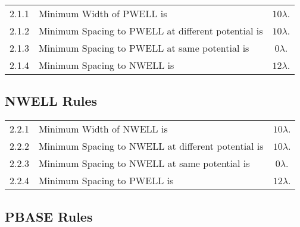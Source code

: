\begin{flushleft}
    \begin{tabular}{c l c}
        2.1.1  & Minimum Width of PWELL is & $ 10 \lambda $. \\
        2.1.2  & Minimum Spacing to PWELL at different potential is & $ 10 \lambda $. \\
        2.1.3  & Minimum Spacing to PWELL at same potential is & $ 0 \lambda $. \\
        2.1.4  & Minimum Spacing to NWELL is & $ 12 \lambda $. \\
    \end{tabular}
\end{flushleft}

\subsection{NWELL Rules}\label{design_rules_nwell_rules}

\begin{center}
\end{center}

\begin{flushleft}
    \begin{tabular}{c l c}
        2.2.1  & Minimum Width of NWELL is & $ 10 \lambda $. \\
        2.2.2  & Minimum Spacing to NWELL at different potential is & $ 10 \lambda $. \\
        2.2.3  & Minimum Spacing to NWELL at same potential is & $ 0 \lambda $. \\
        2.2.4  & Minimum Spacing to PWELL is & $ 12 \lambda $. \\
    \end{tabular}
\end{flushleft}

\subsection{PBASE Rules}\label{design_rules_pbase_rules}


